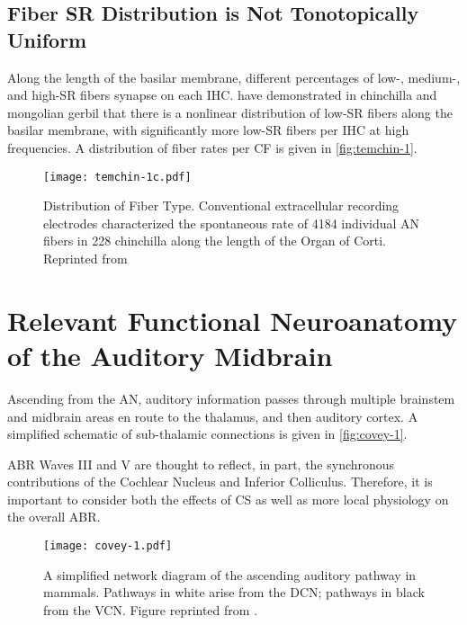 \subsection{Fiber SR Distribution is Not Tonotopically Uniform} %
\label{sub:fiber_rates_are_tonotopically_nonuniform}
Along the length of the basilar membrane, different percentages of low-, medium-, and high-SR fibers synapse on each IHC.  \cite{Temchin2008Threshold,Temchin2014Spatial,Bourien2014Contribution} have demonstrated in chinchilla and mongolian gerbil that there is a nonlinear distribution of low-SR fibers along the basilar membrane, with significantly more low-SR fibers per IHC at high frequencies.   A distribution of fiber rates per CF is given in \autoref{fig:temchin-1}.

\begin{figure}[htbp]
	\centering
	\texttt{[image: temchin-1c.pdf]}
	\caption[Distribution of Fiber Type]{Distribution of Fiber Type. Conventional extracellular recording electrodes characterized the spontaneous rate of 4184 individual AN fibers in 228 chinchilla along the length of the Organ of Corti. Reprinted from \cite{Temchin2008Threshold}}
	\label{fig:temchin-1}
\end{figure}

\section{Relevant Functional Neuroanatomy of the Auditory Midbrain} %
\label{sec:relevant_functional_neuroanatomy_of_the_auditory_midbrain}
Ascending from the AN, auditory information passes through multiple brainstem and midbrain areas en route to the thalamus, and then auditory cortex.  A simplified schematic of sub-thalamic connections is given in \autoref{fig:covey-1}. 

ABR Waves III and V are thought to reflect, in part, the synchronous contributions of the Cochlear Nucleus and Inferior Colliculus.  Therefore, it is important to consider both the effects of CS as well as more local physiology on the overall ABR.

\begin{figure}[htbp]
	\centering
	\texttt{[image: covey-1.pdf]}
	\caption[Ascending Auditory Pathway]{A simplified network diagram of the ascending auditory pathway in mammals.  Pathways in white arise from the DCN; pathways in black from the VCN.  Figure reprinted from \cite{Covey2008Inputs}.}
	\label{fig:covey-1}
\end{figure}

